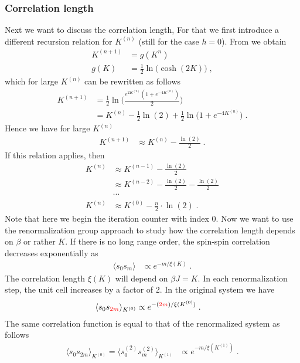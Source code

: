 \subsubsection{Correlation length}
Next we want to discuss the correlation length, For that we first 
introduce a different  recursion relation for  $K^{(n)}$ (still for the case $h=0$).
From   we obtain
%
\begin{align}\label{eq:rec:rel:K:b}
K^{(n+1)}  &= g(K^{n})\\
g(K) &= \frac{1}{2} \ln\bigg(\cosh(2 K) \bigg)\;,
\end{align}
which for large $K^{(n)}$ can be rewritten as follows
\begin{align*}
K^{(n+1)}  &= \frac{1}{2} \ln\bigg(\frac{e^{2 K^{(n)}}(1+e^{-4 K^{(n)}})}{2}\bigg)\\
&= K^{(n)} - \frac12 \ln(2) + \frac12\ln\big(1+e^{-4 K^{(n)}}  \big)\;.
\end{align*}
Hence we have for large $K^{(n)}$
\begin{align}\label{eq:rec:rel:K:c}
K^{(n+1)}&\approx K^{(n)} - \frac{\ln(2)}{2}\;.
\end{align}
%
If this relation applies, then
%
\begin{align}
K^{(n)}&\approx K^{(n-1)} - \frac{\ln(2)}{2}\nonumber\\
&\approx K^{(n-2)} - \frac{\ln(2)}{2} - \frac{\ln(2)}{2}\nonumber\\
&\cdots\nonumber\\
K^{(n)}&\approx K^{(0)} - \frac{n}{2}\cdot\ln(2)\;.
\label{eq:RG:iter}
\end{align}
%
Note that here we begin the iteration counter with index 0.
Now we want to use the renormalization group approach to study how the
correlation length depends on $\beta$ or rather $K$.
If there is no long range order, the spin-spin correlation  decreases exponentially as
\begin{align*}
\langle s_{0}s_{m} \rangle &\propto e^{-m/\xi(K)}\;.
\end{align*}
%
The correlation length $\xi(K)$ will depend on $\beta J = K$. In each renormalization step,
the unit cell increases by a factor of 2. 
In the original system we have
\begin{align*}
 \langle s_{0}s_{\textcolor{red}{2 m}} \rangle_{K^{(0)}} &\propto e^{-(\textcolor{red}{2 m})/\xi(K^{(0)})}\;.
\end{align*}
The same correlation function is equal to that of the renormalized system as follows
\begin{align*}
 \langle s_{0}s_{2 m} \rangle_{K^{(0)}} 
 = \langle s^{(2)}_{0}s^{(2)}_{m} \rangle_{K^{(1)}} 
 &\propto  e^{-m/\xi(K^{(1)})}\;.
\end{align*}

